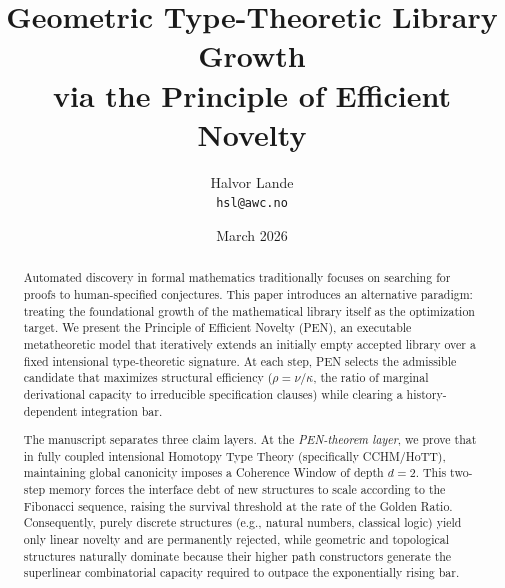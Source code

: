 \documentclass[11pt,a4paper]{article}
\title{\textbf{Geometric Type-Theoretic Library Growth\\
via the Principle of Efficient Novelty}}
\author{Halvor Lande\\
\texttt{hsl@awc.no}}
\date{March 2026}
\theoremstyle{plain}
\theoremstyle{definition}
\theoremstyle{remark}
\begin{document}
\maketitle

\begin{abstract}
Automated discovery in formal mathematics traditionally focuses on searching for proofs to human-specified conjectures. This paper introduces an alternative paradigm: treating the foundational growth of the mathematical library itself as the optimization target. We present the Principle of Efficient Novelty (PEN), an executable metatheoretic model that iteratively extends an initially empty accepted library over a fixed intensional type-theoretic signature. At each step, PEN selects the admissible candidate that maximizes structural efficiency ($\rho = \nu/\kappa$, the ratio of marginal derivational capacity to irreducible specification clauses) while clearing a history-dependent integration bar.

The manuscript separates three claim layers. At the \emph{PEN-theorem layer}, we prove that in fully coupled intensional Homotopy Type Theory (specifically CCHM/HoTT), maintaining global canonicity imposes a Coherence Window of depth $d=2$. This two-step memory forces the interface debt of new structures to scale according to the Fibonacci sequence, raising the survival threshold at the rate of the Golden Ratio. Consequently, purely discrete structures (e.g., natural numbers, classical logic) yield only linear novelty and are permanently rejected, while geometric and topological structures naturally dominate because their higher path constructors generate the superlinear combinatorial capacity required to outpace the exponentially rising bar.


\end{abstract}
\end{document}
